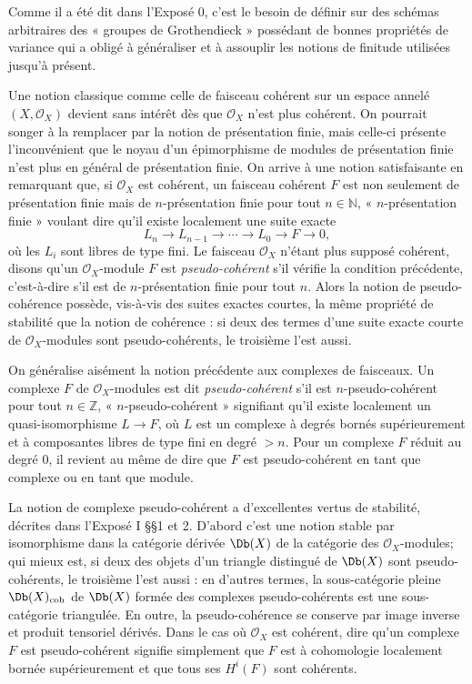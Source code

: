 \documentclass[11pt]{article}
\begin{document}
Comme il a été dit dans l'Exposé 0, c'est le besoin de définir sur des schémas arbitraires des « groupes de Grothendieck » possédant de bonnes propriétés de variance qui a obligé à généraliser et à assouplir les notions de finitude utilisées jusqu'à présent.

Une notion classique comme celle de faisceau cohérent sur un espace annelé \((X,\mathcal O_X)\) devient sans intérêt dès que \(\mathcal O_X\) n'est plus cohérent. On pourrait songer à la remplacer par la notion de présentation finie, mais celle-ci présente l'inconvénient que le noyau d'un épimorphisme de modules de présentation finie n'est plus en général de présentation finie. On arrive à une notion satisfaisante en remarquant que, si \(\mathcal O_X\) est cohérent, un faisceau cohérent \(F\) est non seulement de présentation finie mais de \(n\)-présentation finie pour tout \(n\in\mathbb N\), « \(n\)-présentation finie » voulant dire qu'il existe localement une suite exacte
\[
  L_n\longrightarrow L_{n-1}\longrightarrow \cdots \longrightarrow L_0\longrightarrow F\longrightarrow 0,
\]
où les \(L_i\) sont libres de type fini. Le faisceau \(\mathcal O_X\) n'étant plus supposé cohérent, disons qu'un \(\mathcal O_X\)-module \(F\) est \emph{pseudo-cohérent} s'il vérifie la condition précédente, c'est-à-dire s'il est de \(n\)-présentation finie pour tout \(n\). Alors la notion de pseudo-cohérence possède, vis-à-vis des suites exactes courtes, la même propriété de stabilité que la notion de cohérence : si deux des termes d'une suite exacte courte de \(\mathcal O_X\)-modules sont pseudo-cohérents, le troisième l'est aussi.

On généralise aisément la notion précédente aux complexes de faisceaux. Un complexe \(F\) de \(\mathcal O_X\)-modules est dit \emph{pseudo-cohérent} s'il est \(n\)-pseudo-cohérent pour tout \(n\in\mathbb Z\), « \(n\)-pseudo-cohérent » signifiant qu'il existe localement un quasi-isomorphisme \(L\to F\), où \(L\) est un complexe à degrés bornés supérieurement et à composantes libres de type fini en degré \(>n\). Pour un complexe \(F\) réduit au degré \(0\), il revient au même de dire que \(F\) est pseudo-cohérent en tant que complexe ou en tant que module.

La notion de complexe pseudo-cohérent a d'excellentes vertus de stabilité, décrites dans l'Exposé I §§1 et 2. D'abord c'est une notion stable par isomorphisme dans la catégorie dérivée \(\Db(X)\) de la catégorie des \(\mathcal O_X\)-modules; qui mieux est, si deux des objets d'un triangle distingué de \(\Db(X)\) sont pseudo-cohérents, le troisième l'est aussi : en d'autres termes, la sous-catégorie pleine \(\Db(X)_{\mathrm{coh}}\) de \(\Db(X)\) formée des complexes pseudo-cohérents est une sous-catégorie triangulée. En outre, la pseudo-cohérence se conserve par image inverse et produit tensoriel dérivés. Dans le cas où \(\mathcal O_X\) est cohérent, dire qu'un complexe \(F\) est pseudo-cohérent signifie simplement que \(F\) est à cohomologie localement bornée supérieurement et que tous ses \(H^i(F)\) sont cohérents.
\end{document}

